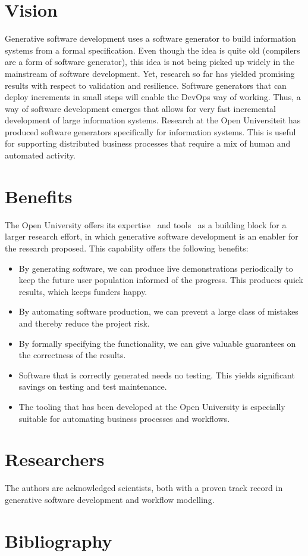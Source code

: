 \documentclass{elsarticle}
\begin{document}
\section{Vision}
   Generative software development uses a software generator to build information systems from a formal specification.
   Even though the idea is quite old (compilers are a form of software generator),
   this idea is not being picked up widely in the mainstream of software development.
   Yet, research so far has yielded promising results with respect to validation and resilience.
   Software generators that can deploy increments in small steps will enable the DevOps way of working.
   Thus, a way of software development emerges that allows for very fast incremental development of large information systems.
   Research at the Open Universiteit has produced software generators specifically for information systems.
   This is useful for supporting distributed business processes that require a mix of human and automated activity.

\section{Benefits}
    The Open University offers its expertise~\cite{JoostenRAMiCS2017,Steenvoorden2022} and tools~\cite{Joosten-JLAMP2018,10.1145/3354166.3354182}
    as a building block for a larger research effort,
    in which generative software development is an enabler for the research proposed.
    This capability offers the following benefits:
\begin{itemize}
    \item By generating software, we can produce live demonstrations periodically to keep the future user population informed of the progress.
    This produces quick results, which keeps funders happy.
    \item By automating software production, we can prevent a large class of mistakes and thereby reduce the project risk.
    \item By formally specifying the functionality, we can give valuable guarantees on the correctness of the results.
    \item Software that is correctly generated needs no testing. This yields significant savings on testing and test maintenance.
    \item The tooling that has been developed at the Open University is especially suitable for automating business processes and workflows.
\end{itemize}

\section{Researchers}
    The authors are acknowledged scientists, both with a proven track record in generative software development and workflow modelling.

\newpage

\section{Bibliography}
    
    
\end{document}
